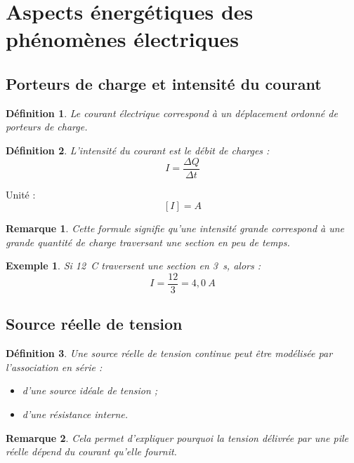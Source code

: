 \documentclass[11pt,a4paper]{article}
\newtheorem{definition}{Définition}[section]
\newtheorem{remarque}{Remarque}[section]
\newtheorem{exemple}{Exemple}[section]
\begin{document}
\section{Aspects énergétiques des phénomènes électriques}

\subsection{Porteurs de charge et intensité du courant}

\begin{definition}
Le courant électrique correspond à un déplacement ordonné de porteurs de charge.
\end{definition}

\begin{definition}
L'intensité du courant est le débit de charges :
\[
I=\frac{\Delta Q}{\Delta t}
\]
\end{definition}

Unité :
\[
[I]=\si{A}
\]

\begin{remarque}
Cette formule signifie qu'une intensité grande correspond à une grande quantité de charge traversant une section en peu de temps.
\end{remarque}

\begin{exemple}
Si \SI{12}{C} traversent une section en \SI{3}{s}, alors :
\[
I=\frac{12}{3}=4,0\ \si{A}
\]
\end{exemple}

\subsection{Source réelle de tension}

\begin{definition}
Une source réelle de tension continue peut être modélisée par l'association en série :
\begin{itemize}
    \item d'une source idéale de tension ;
    \item d'une résistance interne.
\end{itemize}
\end{definition}

\begin{remarque}
Cela permet d'expliquer pourquoi la tension délivrée par une pile réelle dépend du courant qu'elle fournit.
\end{remarque}
\end{document}
